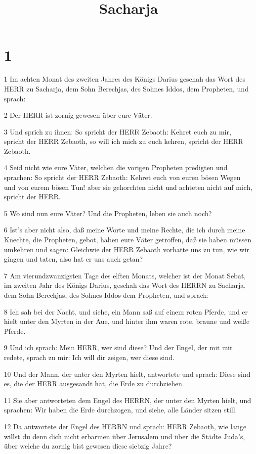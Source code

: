 

\title{Sacharja}


\chapter{1}

\par 1 Im achten Monat des zweiten Jahres des Königs Darius geschah das Wort des HERR zu Sacharja, dem Sohn Berechjas, des Sohnes Iddos, dem Propheten, und sprach:
\par 2 Der HERR ist zornig gewesen über eure Väter.
\par 3 Und sprich zu ihnen: So spricht der HERR Zebaoth: Kehret euch zu mir, spricht der HERR Zebaoth, so will ich mich zu euch kehren, spricht der HERR Zebaoth.
\par 4 Seid nicht wie eure Väter, welchen die vorigen Propheten predigten und sprachen: So spricht der HERR Zebaoth: Kehret euch von euren bösen Wegen und von eurem bösen Tun! aber sie gehorchten nicht und achteten nicht auf mich, spricht der HERR.
\par 5 Wo sind nun eure Väter? Und die Propheten, leben sie auch noch?
\par 6 Ist's aber nicht also, daß meine Worte und meine Rechte, die ich durch meine Knechte, die Propheten, gebot, haben eure Väter getroffen, daß sie haben müssen umkehren und sagen: Gleichwie der HERR Zebaoth vorhatte uns zu tun, wie wir gingen und taten, also hat er uns auch getan?
\par 7 Am vierundzwanzigsten Tage des elften Monats, welcher ist der Monat Sebat, im zweiten Jahr des Königs Darius, geschah das Wort des HERRN zu Sacharja, dem Sohn Berechjas, des Sohnes Iddos dem Propheten, und sprach:
\par 8 Ich sah bei der Nacht, und siehe, ein Mann saß auf einem roten Pferde, und er hielt unter den Myrten in der Aue, und hinter ihm waren rote, braune und weiße Pferde.
\par 9 Und ich sprach: Mein HERR, wer sind diese? Und der Engel, der mit mir redete, sprach zu mir: Ich will dir zeigen, wer diese sind.
\par 10 Und der Mann, der unter den Myrten hielt, antwortete und sprach: Diese sind es, die der HERR ausgesandt hat, die Erde zu durchziehen.
\par 11 Sie aber antworteten dem Engel des HERRN, der unter den Myrten hielt, und sprachen: Wir haben die Erde durchzogen, und siehe, alle Länder sitzen still.
\par 12 Da antwortete der Engel des HERRN und sprach: HERR Zebaoth, wie lange willst du denn dich nicht erbarmen über Jerusalem und über die Städte Juda's, über welche du zornig bist gewesen diese siebzig Jahre?

